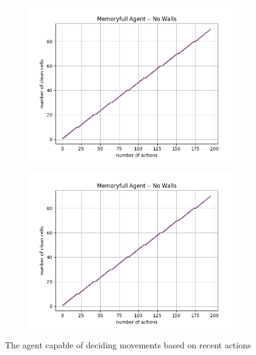 \documentclass[12pt]{article}
\begin{document}
\begin{figure}[!h]
	\centering
	\begin{subfigure}[t]{.48\textwidth}
		\includegraphics[scale=.4]{MemoryFullAgent1}
		\label{fig:MemoryFNoWall}
	\end{subfigure}
	\hfill
	\begin{subfigure}[t]{.48\textwidth}
		\includegraphics[scale=.4]{MemoryFullAgent1}
		\label{fig:MemoryWall}
	\end{subfigure}
	\caption{The agent capable of deciding movements based on recent actions}
	\label{f:Randomless}	
\end{figure}
\end{document}
